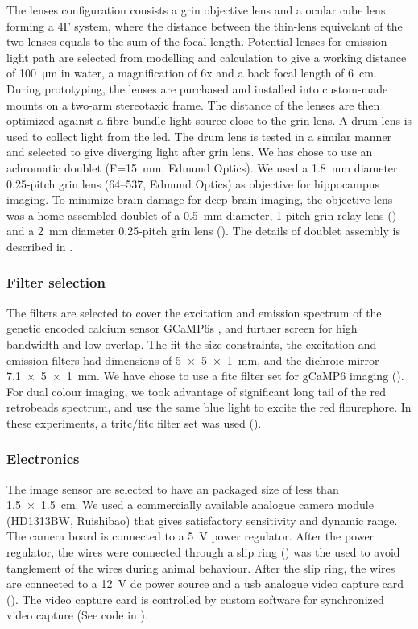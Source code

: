 The lenses configuration consists a \gls{grin} objective lens and a ocular cube lens forming a 4F system, where the distance between the thin-lens equivelant of the two lenses equals to the sum of the focal length. Potential lenses for emission light path are selected from modelling and calculation to give a working distance of \SI{100}{\um} in water, a magnification of 6x and a back focal length of \SI{6}{\cm}. During prototyping, the lenses are purchased and installed into custom-made mounts on a two-arm stereotaxic frame. The distance of the lenses are then optimized against a fibre bundle light source close to the \gls{grin} lens. A drum lens is used to collect light from the \gls{led}. The drum lens is tested in a similar manner and selected to give diverging light after \gls{grin} lens. We has chose to use an achromatic doublet (F=\SI{15}{\mm}, Edmund Optics). We used a \SI{1.8}{\mm} diameter 0.25-pitch \gls{grin} lens (64--537, Edmund Optics) as objective for hippocampus imaging. To minimize brain damage for deep brain imaging, the objective lens was a home-assembled doublet of a \SI{0.5}{\mm} diameter, 1-pitch \gls{grin} relay lens () and a \SI{2}{\mm} diameter 0.25-pitch \gls{grin} lens (). The details of doublet assembly is described in \label{objective assmebly}.

\subsubsection{Filter selection}
The filters are selected to cover the excitation and emission spectrum of the genetic encoded calcium sensor GCaMP6s \citep{chen13}, and further screen for high bandwidth and low overlap. The fit the size constraints, the excitation and emission filters had dimensions of \SI{5x5x1}{\mm}, and the dichroic mirror \SI{7.1x5x1}{\mm}. We have chose to use a \gls{fitc} filter set for gCaMP6 imaging (). For dual colour imaging, we took advantage of significant long tail of the red retrobeads spectrum, and use the same blue light to excite the red flourephore. In these experiments, a \acrshort{tritc}\slash\acrshort{fitc} filter set was used ().

\subsubsection{Electronics}
The image sensor are selected to have an packaged size of less than \SI{1.5 x 1.5}{\cm}. We used a commercially available analogue camera module (HD1313BW, Ruishibao) that gives satisfactory sensitivity and dynamic range. The camera board is connected to a \SI{5}{\V} power regulator. After the power regulator, the wires were connected through a slip ring () was the used to avoid tanglement of the wires during animal behaviour. After the slip ring, the wires are connected to a \SI{12}{\V} \gls{dc} power source and a \gls{usb} analogue video capture card (). The video capture card is controlled by custom software for synchronized video capture (See code in ).

